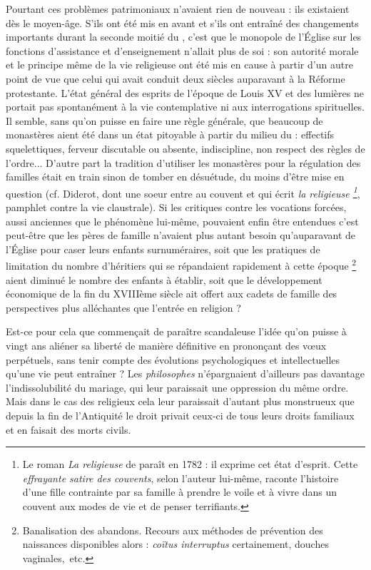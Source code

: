  Pourtant ces problèmes patrimoniaux n'avaient rien de nouveau : ils existaient dès le moyen-âge. S'ils ont été mis en avant et s'ils ont entraîné des changements importants durant la seconde moitié du , c'est que le monopole de l'Église sur les fonctions d'assistance et d'enseignement n'allait plus de soi : son autorité morale et le principe même de la vie religieuse ont été mis en cause à partir d'un autre point de vue que celui qui avait conduit deux siècles auparavant à la Réforme protestante. L'état général des esprits de l'époque de Louis XV et des lumières ne portait pas spontanément à la vie contemplative ni aux interrogations spirituelles. Il semble, sans qu'on puisse en faire une règle générale, que beaucoup de monastères aient été dans un état pitoyable à partir du milieu du  : effectifs squelettiques, ferveur discutable ou absente, indiscipline, non respect des règles de l'ordre... D'autre part la tradition d'utiliser les monastères pour la régulation des familles était en train sinon de tomber en désuétude, du moins d'être mise en question (cf. Diderot, dont une soeur entre au couvent et qui écrit \emph{la religieuse 
\footnote{Le roman \emph{La religieuse} de  paraît en 1782 : il exprime cet état d'esprit. Cette \emph{effrayante satire des couvents}, selon l'auteur lui-même, raconte l'histoire d'une fille contrainte par sa famille à prendre le voile et à vivre dans un couvent aux modes de vie et de penser terrifiants.}}, pamphlet contre la vie claustrale). Si les critiques contre les vocations forcées, aussi anciennes que le phénomène lui-même, pouvaient enfin être entendues c'est peut-être que les pères de famille n'avaient plus autant besoin qu'auparavant de l'Église pour caser leurs enfants surnuméraires, soit que les pratiques de limitation du nombre d'héritiers qui se répandaient rapidement à cette époque%
\footnote{Banalisation des abandons. Recours aux méthodes de prévention des naissances disponibles alors : \emph{coïtus interruptus} certainement, douches vaginales,~etc.} 
aient diminué le nombre des enfants à établir, soit que le développement économique de la fin du XVIIIème siècle  ait offert aux cadets de famille des perspectives plus alléchantes que l'entrée en religion ?

 Est-ce pour cela que commençait de paraître scandaleuse
l'idée qu'on puisse à vingt ans aliéner sa liberté de manière définitive en prononçant des vœux perpétuels, sans tenir compte des évolutions psychologiques et intellectuelles qu'une vie peut entraîner ? Les \emph{philosophes} n'épargnaient d'ailleurs pas davantage l'indissolubilité du mariage, qui leur paraissait une oppression du même ordre. Mais dans le cas des religieux cela leur paraissait d'autant plus monstrueux que depuis la fin de l'Antiquité le droit privait ceux-ci de tous leurs droits familiaux et en faisait des morts civils. 

